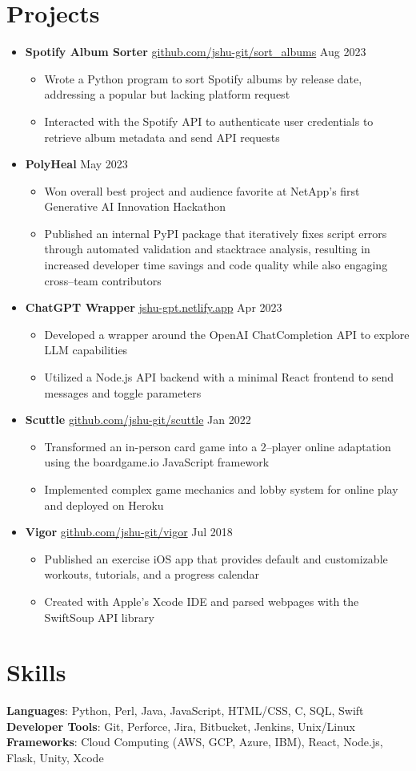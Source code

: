 \documentclass[letterpaper,11pt]{article}
\newcommand{\sectionStart}{\begin{itemize}[leftmargin=0in, label={}]}
\newcommand{\sectionEnd}{\end{itemize}\vspace{-8pt}}
\newcommand{\singleHeading}[2]{
  \item
    #1 \hspace*{\fill} #2 \\
    \vspace{-6pt}
}
\newcommand{\itemListStart}{\begin{itemize}}
\newcommand{\itemListEnd}{\end{itemize}\vspace{-12pt}}
\newcommand{\resumeItem}[1]{
  \item
    \small #1
    \vspace{-3pt} %
}
\begin{document}
  \section{Projects}
    \sectionStart
      \singleHeading{\textbf{Spotify Album Sorter} \href{https://github.com/jshu-git/sort_albums}{github.com/jshu-git/sort\_albums}}{Aug 2023}
        \itemListStart
          \resumeItem{Wrote a Python program to sort Spotify albums by release date, addressing a popular but lacking platform request}
          \resumeItem{Interacted with the Spotify API to authenticate user credentials to retrieve album metadata and send API requests}
        \itemListEnd
      \singleHeading{\textbf{PolyHeal}}{May 2023}
        \itemListStart
          \resumeItem{Won overall best project and audience favorite at NetApp's first Generative AI Innovation Hackathon}
          \resumeItem{Published an internal PyPI package that iteratively fixes script errors through automated validation and stacktrace analysis, resulting in increased developer time savings and code quality while also engaging cross--team contributors}
        \itemListEnd
      \singleHeading{\textbf{ChatGPT Wrapper} \href{https://jshu-gpt.netlify.app}{jshu-gpt.netlify.app}}{Apr 2023}
        \itemListStart
          \resumeItem{Developed a wrapper around the OpenAI ChatCompletion API to explore LLM capabilities}
          \resumeItem{Utilized a Node.js API backend with a minimal React frontend to send messages and toggle parameters}
        \itemListEnd
      \singleHeading{\textbf{Scuttle} \href{https://github.com/jshu-git/scuttle}{github.com/jshu-git/scuttle}}{Jan 2022}
        \itemListStart
          \resumeItem{Transformed an in-person card game into a 2--player online adaptation using the boardgame.io JavaScript framework}
          \resumeItem{Implemented complex game mechanics and lobby system for online play and deployed on Heroku}
        \itemListEnd
      \singleHeading{\textbf{Vigor} \href{https://github.com/jshu-git/vigor}{github.com/jshu-git/vigor}}{Jul 2018}
        \itemListStart
          \resumeItem{Published an exercise iOS app that provides default and customizable workouts, tutorials, and a progress calendar}
          \resumeItem{Created with Apple’s Xcode IDE and parsed webpages with the SwiftSoup API library}
        \itemListEnd
    \sectionEnd

  \section{Skills}
    \sectionStart
      \small{
        \item{
          \textbf{Languages}{: Python, Perl, Java, JavaScript, HTML/CSS, C, SQL, Swift} \\
          \textbf{Developer Tools}{: Git, Perforce, Jira, Bitbucket, Jenkins, Unix/Linux} \\
          \textbf{Frameworks}{: Cloud Computing (AWS, GCP, Azure, IBM), React, Node.js, Flask, Unity, Xcode} \\
        }
      }
    \sectionEnd
    \vspace{-6pt} %
\end{document}
